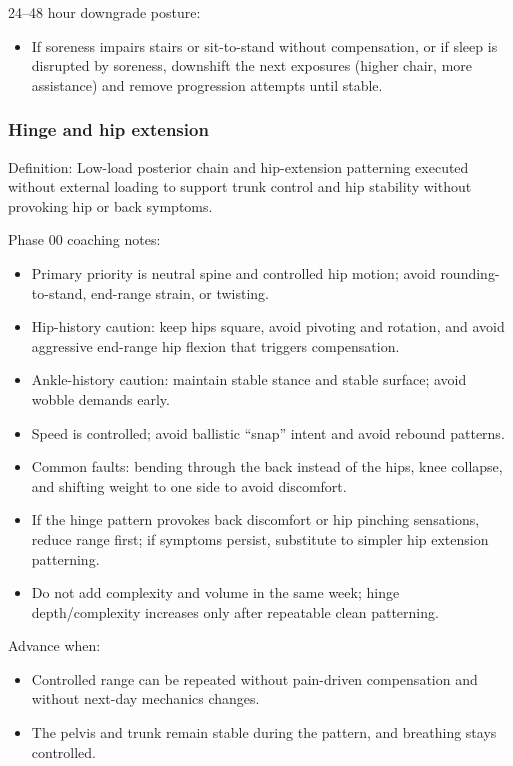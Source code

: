 \documentclass[10pt]{article}
\begin{document}
24–48 hour downgrade posture:

\begin{itemize}
\item If soreness impairs stairs or sit-to-stand without compensation, or if sleep is disrupted by soreness, downshift the next exposures (higher chair, more assistance) and remove progression attempts until stable.
\end{itemize}

\subsubsection*{Hinge and hip extension}

Definition: Low-load posterior chain and hip-extension patterning executed without external loading to support trunk control and hip stability without provoking hip or back symptoms.

Phase 00 coaching notes:

\begin{itemize}
\item Primary priority is neutral spine and controlled hip motion; avoid rounding-to-stand, end-range strain, or twisting.
\item Hip-history caution: keep hips square, avoid pivoting and rotation, and avoid aggressive end-range hip flexion that triggers compensation.
\item Ankle-history caution: maintain stable stance and stable surface; avoid wobble demands early.
\item Speed is controlled; avoid ballistic “snap” intent and avoid rebound patterns.
\item Common faults: bending through the back instead of the hips, knee collapse, and shifting weight to one side to avoid discomfort.
\item If the hinge pattern provokes back discomfort or hip pinching sensations, reduce range first; if symptoms persist, substitute to simpler hip extension patterning.
\item Do not add complexity and volume in the same week; hinge depth/complexity increases only after repeatable clean patterning.
\end{itemize}

Advance when:

\begin{itemize}
\item Controlled range can be repeated without pain-driven compensation and without next-day mechanics changes.
\item The pelvis and trunk remain stable during the pattern, and breathing stays controlled.
\end{itemize}
\end{document}
